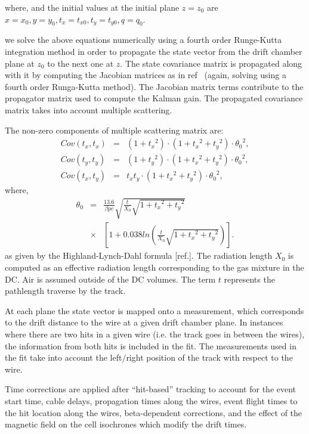 where, and the initial values at the initial plane $z = z_{0}$ are
$x = x_{0}, y = y_{0}, t_x = t_{x0}, t_y = t_{y0}, q = q_{0}$.

we solve the above equations
numerically using a fourth order Runge-Kutta integration method in order to propagate the state vector from
the drift chamber plane at $z_{0}$ to the next one at $z$.  The state covariance matrix is propagated along with it
by computing the Jacobian matrices as in ref~\cite{spiri} (again, solving using a fourth order Runga-Kutta method).
The Jacobian matrix terms contribute to the propagator matrix used to compute the Kalman gain.
The propagated covariance matrix takes into account multiple scattering.

The non-zero components of multiple scattering matrix are:
\begin{eqnarray*}
Cov (t_{x} , t_{x}) &=& (1+{t_x}^{2} )\cdot (1+{t_x}^{2} + {t_y}^2 )\cdot {\theta_{0}}^{2} , \\
Cov (t_{y} , t_{y}) &=& (1+{t_y}^{2} )\cdot (1+{t_x}^{2} + {t_y}^2 )\cdot {\theta_{0}}^{2} , \\
Cov (t_{x} , t_{y}) &=&  t_{x} t_{y}\cdot (1+{t_x}^{2} + {t_y}^2 )\cdot {\theta_{0}}^{2} ,
\end{eqnarray*}
where,
\begin{eqnarray*}
{\theta_{0}} &=& \frac{13.6}{\beta pc}\sqrt{\frac{t}{X_{0}}\sqrt{1+{t_x}^2+{t_y}^2}}\\ &\times&\left[ {1+0.038 ln \left({\frac{t}{X_{0}}\sqrt{1+{t_x}^2+{t_y}^2}}\right) }\right].
\end{eqnarray*}
as given by the Highland-Lynch-Dahl formula [ref.].
The radiation length $X_0$ is computed as an effective radiation length corresponding to the gas mixture in the DC.
Air is assumed outside of the DC volumes. The term $t$ represents the pathlength traverse by the track.

At each plane the state vector is mapped onto a measurement, which corresponds to the drift distance to the
wire at a given drift chamber plane.  In instances where there are two hits in a given wire (i.e. the track
goes in between the wires), the information from both hits is included in the fit.
The measurements used in the fit
take into account the left/right position of the track with respect to the wire.

Time corrections are applied
after ``hit-based'' tracking to account for the event start time, cable delays, propagation times along the
wires, event flight times to the hit location along the wires, beta-dependent corrections, and the effect of
the magnetic field on the cell isochrones which modify the drift times.

